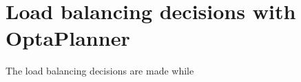 \section{Load balancing decisions with OptaPlanner}\label{sec:load-balancing-optaplanner}
The load balancing decisions are made while 